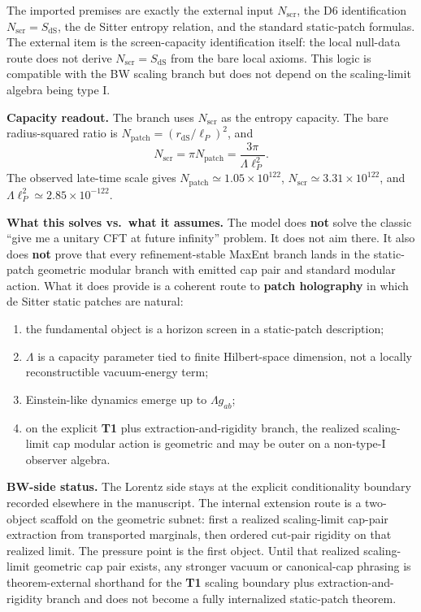 The imported premises are exactly the external input \(N_{\mathrm{scr}}\), the D6 identification
\(N_{\mathrm{scr}}=S_{\mathrm{dS}}\), the de Sitter entropy relation, and the standard static-patch
formulas. The external item is the screen-capacity identification itself: the local null-data
route does not derive \(N_{\mathrm{scr}}=S_{\mathrm{dS}}\) from the bare local axioms. This
logic is compatible with the BW scaling branch but does not depend on the scaling-limit algebra
being type I.

\textbf{Capacity readout.} The branch uses \(N_{\mathrm{scr}}\) as the entropy capacity. The
bare radius-squared ratio is \(N_{\mathrm{patch}}=(r_{\mathrm{dS}}/\ell_P)^2\), and
\[
N_{\mathrm{scr}}=\pi N_{\mathrm{patch}}
=\frac{3\pi}{\Lambda\ell_P^2}.
\]
The observed late-time scale gives \(N_{\mathrm{patch}}\simeq1.05\times10^{122}\),
\(N_{\mathrm{scr}}\simeq3.31\times10^{122}\), and
\(\Lambda\ell_P^2\simeq2.85\times10^{-122}\).

\textbf{What this solves vs.\ what it assumes.} The model does \textbf{not} solve the classic ``give me a unitary CFT at future infinity'' problem. It does not aim there. It also does \textbf{not} prove that every refinement-stable MaxEnt branch lands in the static-patch geometric modular branch with emitted cap pair and standard modular action. What it does provide is a coherent route to \textbf{patch holography} in which de Sitter static patches are natural:
\begin{enumerate}
\def\labelenumi{\arabic{enumi}.}
\item
the fundamental object is a horizon screen in a static-patch description;
\item
\(\Lambda\) is a capacity parameter tied to finite Hilbert-space dimension, not a locally reconstructible vacuum-energy term;
\item
Einstein-like dynamics emerge up to \(\Lambda g_{ab}\);
\item
on the explicit \textbf{T1} plus extraction-and-rigidity branch, the realized scaling-limit cap modular action is geometric and may be outer on a non-type-I observer algebra.
\end{enumerate}

\textbf{BW-side status.} The Lorentz side stays at the explicit conditionality boundary recorded elsewhere in the manuscript. The internal extension route is a two-object scaffold on the geometric subnet: first a realized scaling-limit cap-pair extraction from transported marginals, then ordered cut-pair rigidity on that realized limit. The pressure point is the first object. Until that realized scaling-limit geometric cap pair exists, any stronger vacuum or canonical-cap phrasing is theorem-external shorthand for the \textbf{T1} scaling boundary plus extraction-and-rigidity branch and does not become a fully internalized static-patch theorem.

